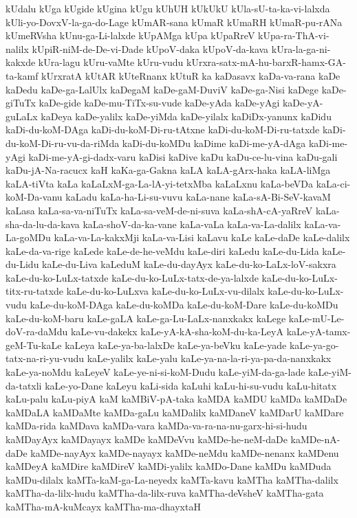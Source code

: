 {kUdalu
kUga
kUgide
kUgina
kUgu
kUhUH
kUkUkU
kUla-sU-ta-ka-vi-lalxda
kUli-yo-DovxV-la-ga-do-Lage
kUmAR-sana
kUmaR
kUmaRH
kUmaR-pu-rANa
kUmeRVsha
kUnu-ga-Li-lalxde
kUpAMga
kUpa
kUpaRreV
kUpa-ra-ThA-vi-nalilx
kUpiR-niM-de-De-vi-Dade
kUpoV-daka
kUpoV-da-kava
kUra-la-ga-ni-kakxde
kUra-lagu
kUru-vaMte
kUru-vudu
kUrxra-satx-mA-hu-barxR-hamx-GA-ta-kamf
kUrxratA
kUtAR
kUteRnanx
kUtuR
ka
kaDasavx
kaDa-va-rana
kaDe
kaDedu
kaDe-ga-LalUlx
kaDegaM
kaDe-gaM-DuviV
kaDe-ga-Nisi
kaDege
kaDe-giTuTx
kaDe-gide
kaDe-mu-TiTx-su-vude
kaDe-yAda
kaDe-yAgi
kaDe-yA-guLaLx
kaDeya
kaDe-yalilx
kaDe-yiMda
kaDe-yilalx
kaDiDx-yanunx
kaDidu
kaDi-du-koM-DAga
kaDi-du-koM-Di-ru-tAtxne
kaDi-du-koM-Di-ru-tatxde
kaDi-du-koM-Di-ru-vu-da-riMda
kaDi-du-koMDu
kaDime
kaDi-me-yA-dAga
kaDi-me-yAgi
kaDi-me-yA-gi-dadx-varu
kaDisi
kaDive
kaDu
kaDu-ce-lu-vina
kaDu-gali
kaDu-jA-Na-racucx
kaH
kaKa-ga-Gakna
kaLA
kaLA-gArx-haka
kaLA-liMga
kaLA-tiVta
kaLa
kaLaLxM-ga-La-lA-yi-tetxMba
kaLaLxnu
kaLa-beVDa
kaLa-ci-koM-Da-vanu
kaLadu
kaLa-ha-Li-su-vuvu
kaLa-nane
kaLa-sA-Bi-SeV-kavaM
kaLasa
kaLa-sa-va-niTuTx
kaLa-sa-veM-de-ni-suva
kaLa-shA-cA-yaRreV
kaLa-sha-da-lu-da-kava
kaLa-shoV-da-ka-vane
kaLa-vaLa
kaLa-va-La-dalilx
kaLa-va-La-goMDu
kaLa-va-La-kakxMji
kaLa-va-Lisi
kaLavu
kaLe
kaLe-daDe
kaLe-dalilx
kaLe-da-va-rige
kaLede
kaLe-de-he-veMdu
kaLe-diri
kaLedu
kaLe-du-Lida
kaLe-du-Lidu
kaLe-du-Liva
kaLeduM
kaLe-du-dayAyx
kaLe-du-ko-LaLx-loV-sakxra
kaLe-du-ko-LuLx-tatxde
kaLe-du-ko-LuLx-tatx-de-ya-lalxde
kaLe-du-ko-LuLx-titx-ru-tatxde
kaLe-du-ko-LuLxva
kaLe-du-ko-LuLx-vu-dilalx
kaLe-du-ko-LuLx-vudu
kaLe-du-koM-DAga
kaLe-du-koMDa
kaLe-du-koM-Dare
kaLe-du-koMDu
kaLe-du-koM-baru
kaLe-gaLA
kaLe-ga-Lu-LaLx-nanxkakx
kaLege
kaLe-mU-Le-doV-ra-daMdu
kaLe-vu-dakekx
kaLe-yA-kA-sha-koM-du-ka-LeyA
kaLe-yA-tamx-geM-Tu-kaLe
kaLeya
kaLe-ya-ba-lalxDe
kaLe-ya-beVku
kaLe-yade
kaLe-ya-go-tatx-na-ri-yu-vudu
kaLe-yalilx
kaLe-yalu
kaLe-ya-na-la-ri-ya-pa-da-nanxkakx
kaLe-ya-noMdu
kaLeyeV
kaLe-ye-ni-si-koM-Dudu
kaLe-yiM-da-ga-lade
kaLe-yiM-da-tatxli
kaLe-yo-Dane
kaLeyu
kaLi-sida
kaLuhi
kaLu-hi-su-vudu
kaLu-hitatx
kaLu-palu
kaLu-piyA
kaM
kaMBiV-pA-taka
kaMDA
kaMDU
kaMDa
kaMDaDe
kaMDaLA
kaMDaMte
kaMDa-gaLu
kaMDalilx
kaMDaneV
kaMDarU
kaMDare
kaMDa-rida
kaMDava
kaMDa-vara
kaMDa-va-ra-na-nu-garx-hi-si-hudu
kaMDayAyx
kaMDayayx
kaMDe
kaMDeVvu
kaMDe-he-neM-daDe
kaMDe-nA-daDe
kaMDe-nayAyx
kaMDe-nayayx
kaMDe-neMdu
kaMDe-nenanx
kaMDenu
kaMDeyA
kaMDire
kaMDireV
kaMDi-yalilx
kaMDo-Dane
kaMDu
kaMDuda
kaMDu-dilalx
kaMTa-kaM-ga-La-neyedx
kaMTa-kavu
kaMTha
kaMTha-dalilx
kaMTha-da-lilx-hudu
kaMTha-da-lilx-ruva
kaMTha-deVsheV
kaMTha-gata
kaMTha-mA-kuMcayx
kaMTha-ma-dhayxtaH
}
